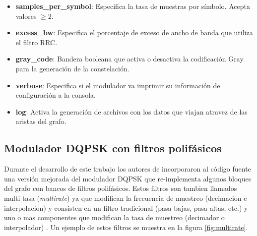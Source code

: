 \begin{itemize}
  \item \textbf{samples\_per\_symbol}: Especifica la tasa de muestras por s\'imbolo. Acepta valores $\geq 2$.
  \item \textbf{excess\_bw}: Especifica el porcentaje de exceso de ancho de banda que utiliza el filtro RRC.
  \item \textbf{gray\_code}: Bandera booleana que activa o desactiva la codificaci\'on Gray para la generaci\'on de la
  constelaci\'on.
  \item \textbf{verbose}: Especifica si el modulador va imprimir su informaci\'on de configuraci\'on a la consola.
  \item \textbf{log}: Activa la generaci\'on de archivos con los datos que viajan atravez de las aristas del grafo.
\end{itemize} 



\subsection{Modulador DQPSK con filtros polif\'asicos}
Durante el desarrollo de este trabajo los autores de \gnuradio incorporaron al c\'odigo fuente una
versi\'on mejorada del modulador DQPSK que re-implementa algunos bloques del grafo con bancos de
filtros polif\'asicos. Estos filtros son tambien llamados multi tasa (\emph{multirate}) ya que
modifican la frecuencia de muestreo (decimacion e interpolacion) y consisten en un filtro
tradicional (pasa bajas, pasa altas, etc.) y uno o mas componentes que modifican la tasa de muestreo
(decimador o interpolador) \cite{behrouz}. Un ejemplo de estos filtros se muestra en la figura \ref{fig:multirate}.

